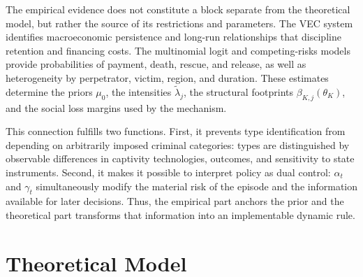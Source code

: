 \documentclass[12pt,a4paper]{article}
\theoremstyle{plain}
\theoremstyle{definition}
\theoremstyle{remark}
\newcommand{\1}{\mathbf{1}}
\begin{document}
The empirical evidence does not constitute a block separate from the theoretical model,
but rather the source of its restrictions and parameters. The VEC system identifies
macroeconomic persistence and long-run relationships that discipline retention and
financing costs. The multinomial logit and competing-risks models provide probabilities
of payment, death, rescue, and release, as well as heterogeneity by perpetrator, victim,
region, and duration. These estimates determine the priors $\mu_0$, the intensities
$\tilde\lambda_j$, the structural footprints $\beta_{K,j}(\theta_K)$, and the social
loss margins used by the mechanism.

This connection fulfills two functions. First, it prevents type identification from
depending on arbitrarily imposed criminal categories: types are distinguished by
observable differences in captivity technologies, outcomes, and sensitivity to state
instruments. Second, it makes it possible to interpret policy as dual control:
$\alpha_t$ and $\gamma_t$ simultaneously modify the material risk of the episode and the
information available for later decisions. Thus, the empirical part anchors the prior
and the theoretical part transforms that information into an implementable dynamic rule.

\section{Theoretical Model}
\label{sec:model}
\label{sec:introduccion-mechanism}
\end{document}
